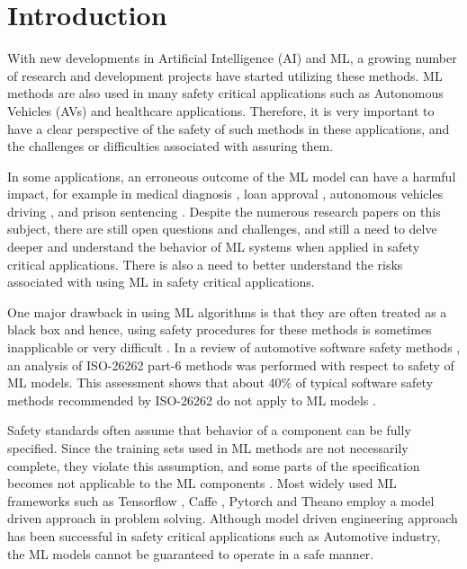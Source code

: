 \chapter{Introduction}

With new developments in Artificial Intelligence (AI) and ML, a growing number of research and development projects have started utilizing these methods.
ML methods are also used in many safety critical applications such as Autonomous Vehicles (AVs) and healthcare applications. Therefore, it is very important to have a clear perspective of the safety of such methods in these applications, and the challenges or difficulties associated with assuring them.

In some applications, an erroneous outcome of the ML model can have a harmful impact, for example in medical diagnosis \cite{Foster2014}, loan approval \cite{Lessmann2015}, autonomous vehicles driving \cite{koopman2016challenges}, and prison sentencing \cite{Berk2015}.
Despite the numerous research papers on this subject, there are still open questions and challenges, and still a need to delve deeper and understand the behavior of ML systems when applied in safety critical applications. There is also a need to better understand the risks associated with using ML in safety critical applications.

One major drawback in using ML algorithms is that they are often treated as a black box and hence, using safety procedures for these methods is sometimes inapplicable or very difficult \cite{Schwalbe2020}. In a review of automotive software safety methods \cite{Salay2017}, an analysis of ISO-26262 part-6 methods was performed with respect to safety of ML models. This assessment shows that about 40\% of typical software safety methods recommended by ISO-26262 do not apply to ML models \cite{Salay2017}.


Safety standards often assume that behavior of a component can be fully specified. Since the training sets used in ML methods are not necessarily complete, they violate this assumption, and some parts of the specification becomes not applicable to the ML components \cite{Salay2017}. 
Most widely used ML frameworks such as Tensorflow \cite{Abadi2016Tensor}, Caffe \cite{Caffe2014}, Pytorch \cite{pytorch2019} and Theano \cite{Al-Rfou} employ a model driven approach in problem solving. Although model driven engineering approach has been successful in safety critical applications such as Automotive industry, the ML models cannot be guaranteed to operate in a safe manner. 

